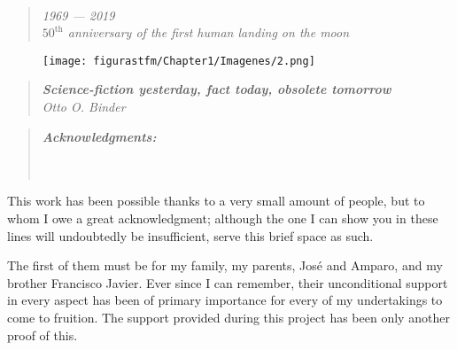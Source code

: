 

\textbf{\emph{\large }}\\
\vspace{4cm}

\begin{quotation}
\centering 
\textit{{\emph{1969 --- 2019}}}\\
\textit{{\emph{$50^{\text{th}}$ anniversary of the first human landing on the moon}}}

\end{quotation}
\begin{figure}[H]
	\centering
		\texttt{[image: figurastfm/Chapter1/Imagenes/2.png]}
	\label{fig:vostok1}
\end{figure}

\begin{quotation}
\centering 
\textbf{\emph{Science-fiction yesterday, fact today, obsolete tomorrow}}\\
\textit{{\emph{Otto O. Binder}}}\\

\end{quotation}

\afterpage{\blankpage}


\clearpage
{}
{}


\begin{quotation}
\noindent \begin{center}
\textbf{\emph{\Large Acknowledgments:}}\textbf{\emph{\large }}\\
\textbf{\emph{\large }}\\
\textbf{\emph{\large }}\\
\textbf{\emph{\large }}
\par\end{center}{\large \par}
\end{quotation}

This work has been possible thanks to a very small amount of people, but to whom I owe a great acknowledgment; although the one I can show you in these lines will undoubtedly be insufficient, serve this brief space as such.

The first of them must be for my family, my parents, José and Amparo, and my brother Francisco Javier. Ever since I can remember, their unconditional support in every aspect has been of primary importance for every of my undertakings to come to fruition. The support provided during this project has been only another proof of this.

